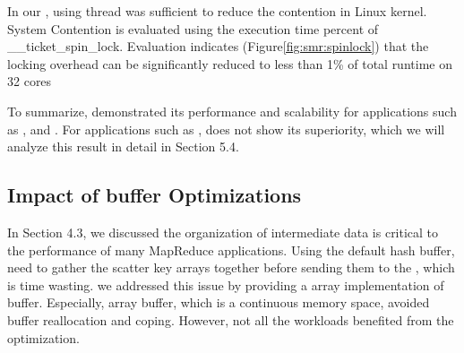 In our \myds, using \myth thread was sufficient to reduce the contention in Linux kernel. 
System Contention is evaluated using the execution time percent of \_\_ticket\_spin\_lock. 
Evaluation indicates (Figure\ref{fig:smr:spinlock}) that the locking overhead can be significantly reduced to less than 1\% of total runtime on 32 cores








To summarize, \myds demonstrated its performance and scalability for applications such as ,  and .
For applications such as , \myds does not show its superiority, which we will analyze this result in detail in Section 5.4.

\subsection{ Impact of buffer Optimizations}
In Section 4.3, we discussed the organization of intermediate data is critical to the performance of many MapReduce applications.
Using the default hash buffer, need to gather the scatter key arrays together before sending them to the , which is time wasting.
we addressed this issue by providing a array implementation of buffer. 
Especially, array buffer, which is a continuous memory space, avoided buffer reallocation and coping.
However, not all the workloads benefited from the optimization.




